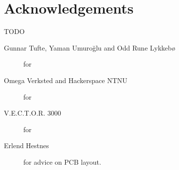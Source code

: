 \chapter*{Acknowledgements}

TODO

\begin{description}
\item[Gunnar Tufte, Yaman Umuroğlu and Odd Rune Lykkebø] for 

\item[Omega Verksted and Hackerspace NTNU] for

\item[V.E.C.T.O.R. 3000] for

\item[Erlend Hestnes] for advice on PCB layout.
\end{description}
